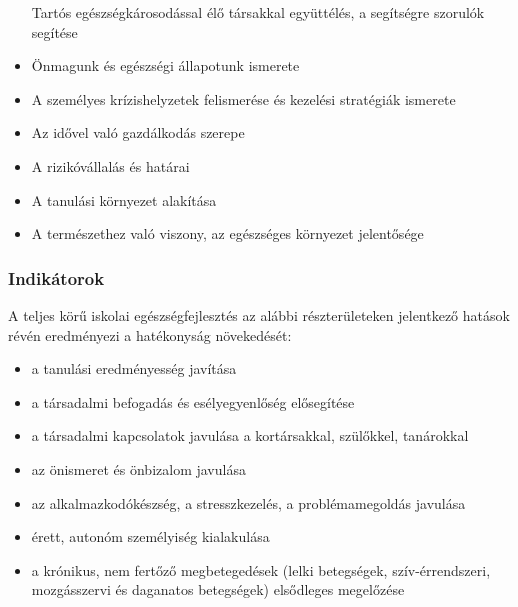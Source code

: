 \begin{itemize}
            Tartós egészségkárosodással élő társakkal együttélés, a segítségre
            szorulók segítése
      \item
            Önmagunk és egészségi állapotunk ismerete
      \item
            A személyes krízishelyzetek felismerése és kezelési stratégiák
            ismerete
      \item
            Az idővel való gazdálkodás szerepe
      \item
            A rizikóvállalás és határai
      \item
            A tanulási környezet alakítása
      \item
            A természethez való viszony, az egészséges környezet jelentősége
\end{itemize}

\subsubsection{Indikátorok}\label{indikuxe1torok}

A teljes körű iskolai egészségfejlesztés az alábbi részterületeken
jelentkező hatások révén eredményezi a hatékonyság növekedését:

\begin{itemize}

      \item
            a tanulási eredményesség javítása
      \item
            a társadalmi befogadás és esélyegyenlőség elősegítése
      \item
            a társadalmi kapcsolatok javulása a kortársakkal, szülőkkel,
            tanárokkal
      \item
            az önismeret és önbizalom javulása
      \item
            az alkalmazkodókészség, a stresszkezelés, a problémamegoldás
            javulása
      \item
            érett, autonóm személyiség kialakulása
      \item
            a krónikus, nem fertőző megbetegedések (lelki betegségek,
            szív-érrendszeri, mozgásszervi és daganatos betegségek) elsődleges
            megelőzése
\end{itemize}


